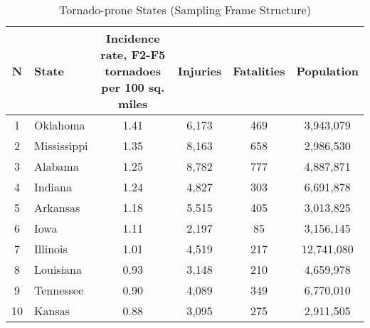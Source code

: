 \begin{table}[htbp]
  
  \caption{Tornado-prone States (Sampling Frame Structure)}
\label{incidence}
\centering
    \begin{tabular}{lrcccc}
\hline \hline
\multicolumn{1}{c}{{\textbf{N}}} & \multicolumn{1}{l}{{\textbf{State}}} & \multicolumn{1}{p{8.57em}}{{\textbf{Incidence rate, F2-F5 tornadoes per 100 sq. miles}}} & \multicolumn{1}{p{4.285em}}{{\textbf{Injuries}}} & \multicolumn{1}{p{4.285em}}{{\textbf{Fatalities}}} & \multicolumn{1}{p{5.5em}}{{\textbf{Population}}} \\
    \hline
    \multicolumn{1}{c}{1} & \multicolumn{1}{l}{Oklahoma} & 1.41  & 6,173 & 469   & \multicolumn{1}{c}{3,943,079} \\
    
    \multicolumn{1}{c}{2} & \multicolumn{1}{l}{Mississippi} & 1.35  & 8,163 & 658   & \multicolumn{1}{c}{2,986,530} \\
    
    \multicolumn{1}{c}{3} & \multicolumn{1}{l}{Alabama} & 1.25  & 8,782 & 777   & \multicolumn{1}{c}{4,887,871} \\
    
    \multicolumn{1}{c}{4} & \multicolumn{1}{l}{Indiana} & 1.24  & 4,827 & 303   & \multicolumn{1}{c}{6,691,878} \\
    
   \multicolumn{1}{c}{5} & \multicolumn{1}{l}{Arkansas} & 1.18  & 5,515 & 405   & \multicolumn{1}{c}{3,013,825} \\
    
    \multicolumn{1}{c}{6} & \multicolumn{1}{l}{Iowa} & 1.11  & 2,197 & 85    & \multicolumn{1}{c}{3,156,145} \\
    
    \multicolumn{1}{c}{7} & \multicolumn{1}{l}{Illinois} & 1.01  & 4,519 & 217   & \multicolumn{1}{c}{12,741,080} \\
    
    \multicolumn{1}{c}{8} & \multicolumn{1}{l}{Louisiana} & 0.93  & 3,148 & 210   & \multicolumn{1}{c}{4,659,978} \\
    
    \multicolumn{1}{c}{9} & \multicolumn{1}{l}{Tennessee} & 0.90  & 4,089 & 349   & \multicolumn{1}{c}{6,770,010} \\
    
    \multicolumn{1}{c}{10} & \multicolumn{1}{l}{Kansas} & 0.88  & 3,095 & 275   & \multicolumn{1}{c}{2,911,505} \\
    

\end{tabular}
\end{table}
